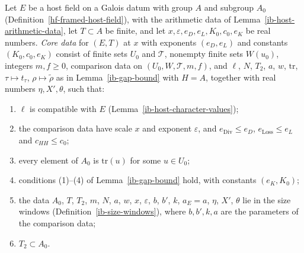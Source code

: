 \begin{definition}\label{ib-core-data}
Let $E$ be a host field on a Galois datum with group $A$ and subgroup $A_0$
(Definition~\ref{hf-framed-host-field}), with the arithmetic data of
Lemma~\ref{ib-host-arithmetic-data}, let $T\subset A$ be finite, and let
$x,\varepsilon,e_D,e_L,K_0,c_0,e_K$ be real numbers. \emph{Core data} for $(E,T)$
at $x$ with exponents $(e_D,e_L)$ and constants $(K_0,c_0,e_K)$ consist of
finite sets $U_0$ and $\mathcal T$, nonempty finite sets $W(u_0)$, integers
$m,f\geq0$, comparison data on $(U_0,W,\mathcal T,m,f)$, and $\ell$, $N$, $T_2$,
$a$, $w$, $\mathrm{tr}$, $\tau\mapsto t_\tau$, $\rho\mapsto\tilde\rho$ as in
Lemma~\ref{ib-gap-bound} with $H=A$, together with real numbers $\eta,X',\theta$,
such that:
\begin{enumerate}
\item $\ell$ is compatible with $E$ (Lemma~\ref{ib-host-character-values});
\item the comparison data have scale $x$ and exponent $\varepsilon$, and
  $e_{\mathrm{Div}}\leq e_D$, $e_{\mathrm{Loss}}\leq e_L$ and $c_{HH}\leq c_0$;
\item every element of $A_0$ is $\mathrm{tr}(u)$ for some $u\in U_0$;
\item conditions (1)--(4) of Lemma~\ref{ib-gap-bound} hold, with constants
  $(e_K,K_0)$;
\item the data $A_0$, $T$, $T_2$, $m$, $N$, $a$, $w$, $x$, $\varepsilon$, $b$,
  $b'$, $k$, $a_E=a$, $\eta$, $X'$, $\theta$ lie in the size windows
  (Definition~\ref{ib-size-windows}), where $b,b',k,a$ are the parameters of the
  comparison data;
\item $T_2\subset A_0$.
\end{enumerate}
\end{definition}

